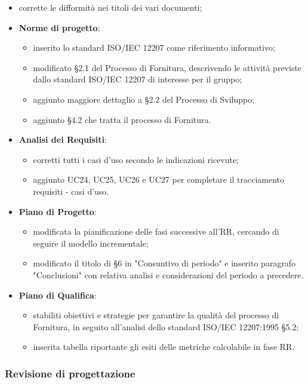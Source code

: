 	\begin{itemize}
		\item corrette le difformità nei titoli dei vari documenti;
		\item \textbf{Norme di progetto}: 
			\begin{itemize}	
				\item inserito lo standard ISO/IEC 12207 come riferimento informativo;
				\item modificato §2.1 del Processo di Fornitura, descrivendo le attività previste dallo standard ISO/IEC 12207 di interesse per il gruppo;
				\item aggiunto maggiore dettaglio a §2.2 del Processo di Sviluppo;
				\item aggiunto §4.2 che tratta il processo di Fornitura.
			\end{itemize}
		\item \textbf{Analisi dei Requisiti}: 
			\begin{itemize}
				\item corretti tutti i casi d'uso secondo le indicazioni ricevute;
				\item aggiunto UC24, UC25, UC26 e UC27 per completare il tracciamento requisiti - casi d'uso.
			\end{itemize} 
		\item \textbf{Piano di Progetto}: 
			\begin{itemize}
				\item modificata la pianificazione delle fasi successive all'RR, cercando di seguire il modello incrementale;
				\item modificato il titolo di §6 in "Consuntivo di periodo" e inserito paragrafo "Conclusioni" con relativa analisi e considerazioni del periodo a precedere.
			\end{itemize}
		\item \textbf{Piano di Qualifica}: 
			\begin{itemize}
				\item stabiliti obiettivi e strategie per garantire la qualità del processo di Fornitura, in seguito all'analisi dello standard ISO/IEC 12207:1995 §5.2;
				\item inserita tabella riportante gli esiti delle metriche calcolabile in fase RR.
			\end{itemize}
	\end{itemize}
\newpage
	\subsubsection{Revisione di progettazione}
	
